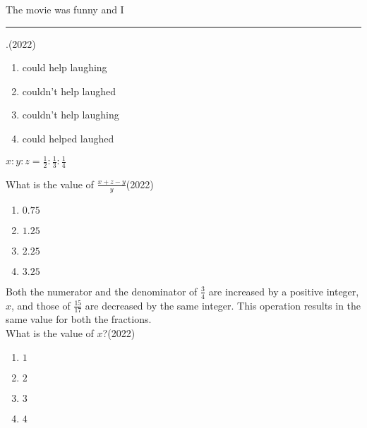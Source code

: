 \iffalse
\chapter{2022}
\author{AI24BTECH11022}
\section{xe}
\fi

\item The movie was funny and I \rule{1cm}{0.15mm}.\hfill(2022)
\begin{multicols}{2}
\begin{enumerate}
\item could help laughing
\item couldn't help laughed
\item couldn't help laughing
\item could helped laughed
\end{enumerate}
\end{multicols}


\item $x:y:z=\frac{1}{2}:\frac{1}{3}:\frac{1}{4}$

What is the value of $\frac{x+z-y}{y}$\hfill(2022)
\begin{multicols}{2}
\begin{enumerate}
\item $0.75$
\item $1.25$
\item $2.25$
\item $3.25$
\end{enumerate}
\end{multicols}


\item Both the numerator and the denominator of $\frac{3}{4}$ are increased by a positive
integer, $x$, and those of $\frac{15}{17}$ are decreased by the same integer. This operation
results in the same value for both the fractions.\\

What is the value of $x$?\hfill(2022)
\begin{multicols}{2}
\begin{enumerate}
\item $1$
\item $2$
\item $3$
\item $4$
\end{enumerate}
\end{multicols}


